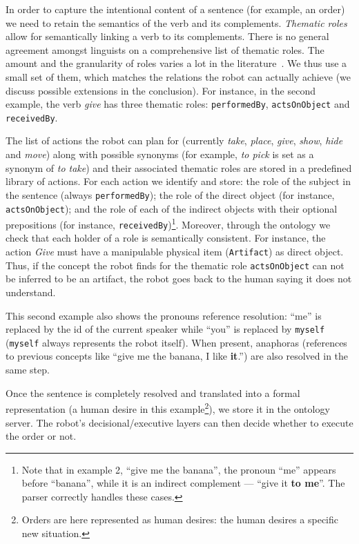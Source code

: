 \documentclass[twocolumn]{svjour3}
\newcommand{\concept}[1]{{\footnotesize \texttt{#1}}}
\begin{document}
\label{processing_of_actions}

In order to capture the intentional content of a sentence (for example, an
order) we need to retain the semantics of the verb and its complements.
\emph{Thematic roles} allow for semantically linking a verb to its complements.  
There is no general agreement amongst linguists on a comprehensive list of 
thematic roles. The amount and the granularity of roles varies a lot in 
the literature~\cite{Gutierrez2001}. We thus use a small set of them, which matches
the relations the robot can actually achieve (we discuss
possible extensions in the conclusion). For instance, in the second example,
the verb \emph{give} has three thematic roles: \concept{performedBy},
\concept{actsOnObject} and \concept{receivedBy}.

The list of actions the robot can plan for (currently \emph{take},
\emph{place}, \emph{give}, \emph{show}, \emph{hide} and \emph{move}) along with
possible synonyms (for example, \emph{to pick} is set as a synonym of \emph{to
take}) and their associated thematic roles are stored in a predefined library
of actions. For each action we identify and store: the role of the subject in
the sentence (always \concept{performedBy}); the role of the direct object
(for instance, \concept{actsOnObject}); and the role of each of the indirect
objects with their optional prepositions (for instance,
\concept{receivedBy})\footnote{Note that in example 2, ``give me the banana'',
the pronoun ``me'' appears before ``banana'', while it is an indirect
complement --- ``give it {\bf to me}''. The parser correctly handles these
cases.}. Moreover, through the ontology we check that each holder of a
role is semantically consistent. For instance, the action \emph{Give} must have a
manipulable physical item (\concept{Artifact}) as direct object. Thus, if the
concept the robot finds for the thematic role \concept{actsOnObject} can not be
inferred to be an artifact, the robot goes back to the human saying it does not
understand.

This second example  also shows the pronouns reference resolution: ``me'' is
replaced by the id of the current speaker while ``you'' is replaced by
\concept{myself} (\concept{myself} always represents the robot itself). When
present, anaphoras (references to previous concepts like ``give me the banana, I
like {\bf it}.'') are also resolved in the same step.

Once the sentence is completely resolved and translated into a formal
representation (a human desire in this example\footnote{Orders are here
represented as human desires: the human desires a specific new situation.}), we
store it in the ontology server. The robot's decisional/executive layers can
then decide whether to execute the order or not. 
\end{document}
